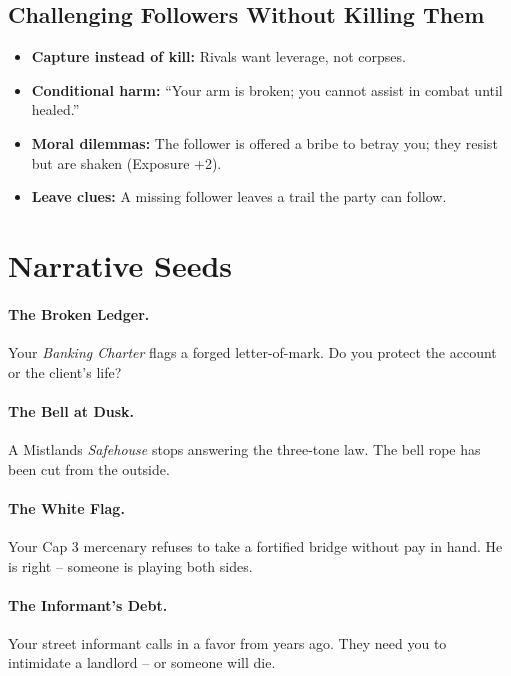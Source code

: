 \subsection*{Challenging Followers Without Killing Them}
\begin{itemize}
  \item \textbf{Capture instead of kill:} Rivals want leverage, not corpses.
  \item \textbf{Conditional harm:} ``Your arm is broken; you cannot assist in combat until healed.''
  \item \textbf{Moral dilemmas:} The follower is offered a bribe to betray you; they resist but are shaken (Exposure +2).
  \item \textbf{Leave clues:} A missing follower leaves a trail the party can follow.
\end{itemize}

\section{Narrative Seeds}
\paragraph{The Broken Ledger.}
Your \emph{Banking Charter} flags a forged letter-of-mark. Do you protect the account or the client's life?

\paragraph{The Bell at Dusk.}
A Mistlands \emph{Safehouse} stops answering the three-tone law. The bell rope has been cut from the outside.

\paragraph{The White Flag.}
Your Cap 3 mercenary refuses to take a fortified bridge without pay in hand. He is right -- someone is playing both sides.

\paragraph{The Informant's Debt.}
Your street informant calls in a favor from years ago. They need you to intimidate a landlord -- or someone will die.

